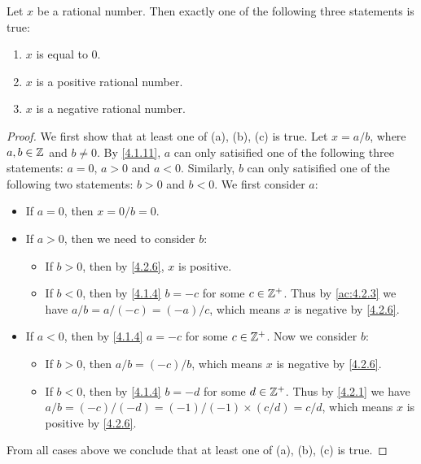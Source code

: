 \begin{lem}\label{4.2.7}
  Let \(x\) be a rational number.
  Then exactly one of the following three statements is true:
  \begin{enumerate}
    \item \(x\) is equal to \(0\).
    \item \(x\) is a positive rational number.
    \item \(x\) is a negative rational number.
  \end{enumerate}
\end{lem}

\begin{proof}
  We first show that at least one of (a), (b), (c) is true.
  Let \(x = a / b\), where \(a, b \in \mathbb{Z}\) and \(b \neq 0\).
  By \cref{4.1.11}, \(a\) can only satisified one of the following three statements:
  \(a = 0\), \(a > 0\) and \(a < 0\).
  Similarly, \(b\) can only satisified one of the following two statements:
  \(b > 0\) and \(b < 0\).
  We first consider \(a\):
  \begin{itemize}
    \item If \(a = 0\), then \(x = 0 / b = 0\).
    \item If \(a > 0\), then we need to consider \(b\):
          \begin{itemize}
            \item If \(b > 0\), then by \cref{4.2.6}, \(x\) is positive.
            \item If \(b < 0\), then by \cref{4.1.4} \(b = -c\) for some \(c \in \mathbb{Z}^+\).
                  Thus by \cref{ac:4.2.3} we have \(a / b = a / (-c) = (-a) / c\), which means \(x\) is negative by \cref{4.2.6}.
          \end{itemize}
    \item If \(a < 0\), then by \cref{4.1.4} \(a = -c\) for some \(c \in \mathbb{Z}^+\).
          Now we consider \(b\):
          \begin{itemize}
            \item If \(b > 0\), then \(a / b = (-c) / b\), which means \(x\) is negative by \cref{4.2.6}.
            \item If \(b < 0\), then by \cref{4.1.4} \(b = -d\) for some \(d \in \mathbb{Z}^+\).
                  Thus by \cref{4.2.1} we have \(a / b = (-c) / (-d) = (-1) / (-1) \times (c / d) = c / d\), which means \(x\) is positive by \cref{4.2.6}.
          \end{itemize}
  \end{itemize}
  From all cases above we conclude that at least one of (a), (b), (c) is true.


\end{proof}
